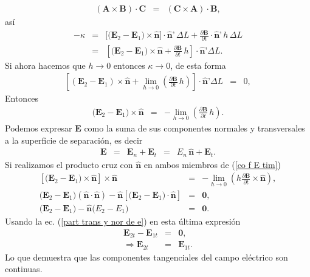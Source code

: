 \begin{eqnarray}
(\textbf{A}\times\textbf{B})\cdot\textbf{C}&=&(\textbf{C}\times\textbf{A})\cdot\textbf{B},
\end{eqnarray}
así
\begin{eqnarray}
-\kappa&=&\big[\big(\textbf{E}_2-\textbf{E}_1\big)\times\hat{\textbf{n}}\big]\cdot\hat{\textbf{n}}\textbf{'}\,\Delta L+\frac{\partial\textbf{B}}{\partial t}\cdot\hat{\textbf{n}}\textbf{'}\,h\,\Delta L\nonumber\\
&=&\left[ \big(\textbf{E}_2-\textbf{E}_1\big)\times\hat{\textbf{n}}+\frac{\partial\textbf{B}}{\partial t}\,h\right] \cdot\hat{\textbf{n}}\textbf{'}\Delta L.
\end{eqnarray}
Si ahora hacemos que $h\rightarrow 0$ entonces $\kappa\rightarrow 0$, de esta forma
\begin{eqnarray}
\left[ \left( \textbf{E}_2-\textbf{E}_1\right) \times\hat{\textbf{n}}+\lim_{h\rightarrow 0}\left( \frac{\partial\textbf{B}}{\partial t}\,h\right) \right] \cdot\hat{\textbf{n}}\textbf{'}\Delta L&=&0,
\end{eqnarray}
Entonces
\begin{eqnarray}
\big(\textbf{E}_2-\textbf{E}_1\big)\times\hat{\textbf{n}}&=&-\lim_{h\rightarrow 0}\left( \frac{\partial\textbf{B}}{\partial t}\,h\right).\label{co f E tim}
\end{eqnarray}
Podemos expresar $\textbf{E}$ como la suma de sus componentes normales y transversales a la superficie de separación, es decir
\begin{eqnarray}
\textbf{E}&=&\textbf{E}_n+\textbf{E}_t\,\,\,=\,\,\,E_n\,\hat{\textbf{n}}+\textbf{E}_t.\label{part trans y nor de e}
\end{eqnarray}
Si realizamos el producto cruz con $\hat{\textbf{n}}$ en ambos miembros de (\ref{co f E tim})
\begin{eqnarray}
\left[ \big(\textbf{E}_{2}-\textbf{E}_{1}\big)\times\hat{\textbf{n}}\right] \times\hat{\textbf{n}}&=&-\lim_{h\rightarrow 0}\left( h\frac{\partial\textbf{B}}{\partial t}\times\hat{\textbf{n}}\right),\nonumber\\
\big(\textbf{E}_{2}-\textbf{E}_{1}\big)(\hat{\textbf{n}}\cdot\hat{\textbf{n}})-\hat{\textbf{n}}\left[ \big(\textbf{E}_{2}-\textbf{E}_{1}\big)\cdot \hat{\textbf{n}}\right]&=&\textbf{0},\nonumber\\
\big(\textbf{E}_{2}-\textbf{E}_{1}\big)-\hat{\textbf{n}}\big(E_{2}-E_{1}\big)&=&\textbf{0}.
\end{eqnarray}
Usando la ec. (\ref{part trans y nor de e}) en esta última expresión
\begin{eqnarray}
\textbf{E}_{2t}-\textbf{E}_{1t}&=&\textbf{0},\nonumber\\
\Rightarrow\textbf{E}_{2t}&=&\textbf{E}_{1t}.
\end{eqnarray}
Lo que demuestra que las componentes tangenciales del campo eléctrico son continuas.



